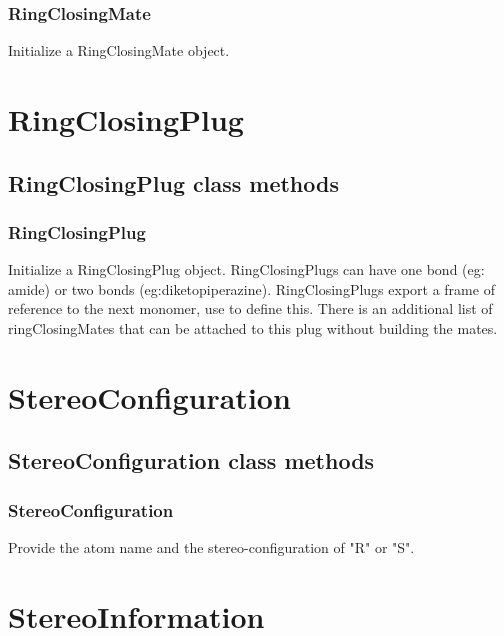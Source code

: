 \begin{itemize}
\subsubsection{RingClosingMate}

Initialize a RingClosingMate object.

\section{RingClosingPlug}
\subsection{RingClosingPlug class methods}
\subsubsection{RingClosingPlug}

Initialize a RingClosingPlug object. RingClosingPlugs can have one bond (eg: amide) or two bonds (eg:diketopiperazine).
RingClosingPlugs export a frame of reference to the next monomer, use  to define this.
There is an additional list of ringClosingMates that can be attached to this plug without building the mates.

\section{StereoConfiguration}
\subsection{StereoConfiguration class methods}
\subsubsection{StereoConfiguration}

Provide the atom name and the stereo-configuration  of "R" or "S".

\section{StereoInformation}

\end{itemize}
